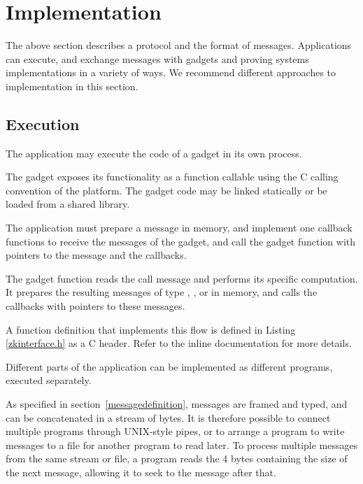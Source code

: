 \section{Implementation}
\label{sec:implementation}

The above section describes a protocol and the format of messages.
Applications can execute, and exchange messages with
gadgets and proving systems implementations in a variety of ways.
We recommend different approaches to implementation in this section.


\subsection{Execution}

\label{inmemory}
The application may execute the code of a gadget in its own process.

The gadget exposes its functionality as a function callable using the C calling convention of the platform. The gadget code may be linked statically or be loaded from a shared library.

The application must prepare a  message in memory, and implement one callback functions to receive the messages of the gadget,
and call the gadget function with pointers to the message and the callbacks.

The gadget function reads the call message and performs its specific computation. It prepares the resulting messages of type
, , or 
in memory, and calls the callbacks with pointers to these messages.

A function definition that implements this flow is defined in Listing \ref{zkinterface.h} as a C header. Refer to the inline documentation for more details.



Different parts of the application can be implemented as different
programs, executed separately.

As specified in section~\ref{messagedefinition}, messages are framed and typed,
and can be concatenated in a stream of bytes. It is therefore possible to connect multiple programs through UNIX-style pipes, or to arrange a program to write messages to a file for another program to read later.
To process multiple messages from the same stream or file, a program
reads the 4 bytes containing the size of the next message, allowing it to seek
to the message after that.

